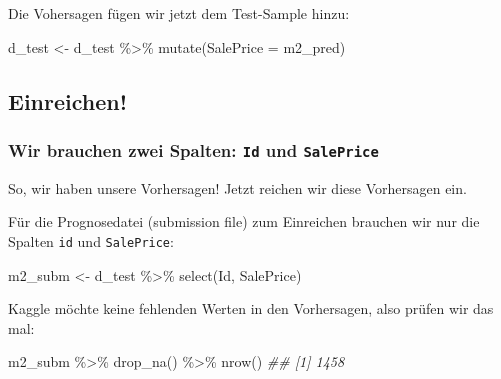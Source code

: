\documentclass[
  a4paper,
]{scrbook}
\newenvironment{Shaded}{\begin{snugshade}}{\end{snugshade}}
\newcommand{\AttributeTok}[1]{\textcolor[rgb]{0.40,0.45,0.13}{#1}}
\newcommand{\DocumentationTok}[1]{\textcolor[rgb]{0.37,0.37,0.37}{\textit{#1}}}
\newcommand{\FunctionTok}[1]{\textcolor[rgb]{0.28,0.35,0.67}{#1}}
\newcommand{\NormalTok}[1]{\textcolor[rgb]{0.00,0.23,0.31}{#1}}
\newcommand{\OtherTok}[1]{\textcolor[rgb]{0.00,0.23,0.31}{#1}}
\newcommand{\SpecialCharTok}[1]{\textcolor[rgb]{0.37,0.37,0.37}{#1}}
\theoremstyle{definition}
\theoremstyle{definition}
\theoremstyle{definition}
\theoremstyle{remark}
\newcommand*\circled[1]{\tikz[baseline=(char.base)]{
          \node[shape=circle,draw,inner sep=1pt] (char) {{\scriptsize#1}};}}
\begin{document}
Die Vohersagen fügen wir jetzt dem Test-Sample hinzu:

\begin{Shaded}
\begin{Highlighting}[]
\NormalTok{d\_test }\OtherTok{\textless{}{-}} 
\NormalTok{  d\_test }\SpecialCharTok{\%\textgreater{}\%} 
  \FunctionTok{mutate}\NormalTok{(}\AttributeTok{SalePrice =}\NormalTok{ m2\_pred)}
\end{Highlighting}
\end{Shaded}

\subsection{Einreichen!}\label{einreichen}

\subsubsection{\texorpdfstring{Wir brauchen zwei Spalten: \texttt{Id}
und
\texttt{SalePrice}}{Wir brauchen zwei Spalten: Id und SalePrice}}\label{wir-brauchen-zwei-spalten-id-und-saleprice}

So, wir haben unsere Vorhersagen! Jetzt reichen wir diese Vorhersagen
ein.

Für die Prognosedatei (submission file) zum Einreichen brauchen wir nur
die Spalten \texttt{id} und \texttt{SalePrice}:

\begin{Shaded}
\begin{Highlighting}[]
\NormalTok{m2\_subm }\OtherTok{\textless{}{-}}
\NormalTok{  d\_test }\SpecialCharTok{\%\textgreater{}\%} 
  \FunctionTok{select}\NormalTok{(Id, SalePrice)}
\end{Highlighting}
\end{Shaded}

Kaggle möchte keine fehlenden Werten in den Vorhersagen, also prüfen wir
das mal:

\label{annotated-cell-96}%
\begin{Shaded}
\begin{Highlighting}[]
\NormalTok{m2\_subm }\SpecialCharTok{\%\textgreater{}\%} 
  \FunctionTok{drop\_na}\NormalTok{() }\SpecialCharTok{\%\textgreater{}\%} \hspace*{\fill}\NormalTok{\circled{1}}
  \FunctionTok{nrow}\NormalTok{() }\hspace*{\fill}\NormalTok{\circled{2}}
\DocumentationTok{\#\# [1] 1458}
\end{Highlighting}
\end{Shaded}
\end{document}
